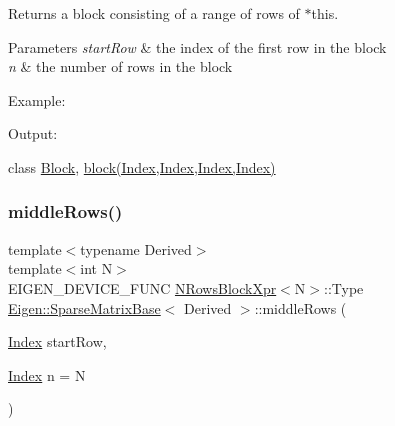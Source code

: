 \begin{DoxyReturn}{Returns}
a block consisting of a range of rows of $\ast$this.
\end{DoxyReturn}

\begin{DoxyParams}{Parameters}
{\em start\+Row} & the index of the first row in the block \\
\hline
{\em n} & the number of rows in the block\\
\hline
\end{DoxyParams}
Example\+: 
\begin{DoxyCodeInclude}{0}
\end{DoxyCodeInclude}
 Output\+: 
\begin{DoxyVerbInclude}
\end{DoxyVerbInclude}
 class \mbox{\hyperlink{class_eigen_1_1_block}{Block}}, \mbox{\hyperlink{class_eigen_1_1_sparse_matrix_base_a7c28a2f511181c727396d5e813519d38}{block(\+Index,\+Index,\+Index,\+Index)}} \mbox{\label{class_eigen_1_1_sparse_matrix_base_a8f5970f79bfb2f270e29a0669c3e8493}} 
\subsubsection{\texorpdfstring{middleRows()}{middleRows()}\hspace{0.1cm}{\footnotesize\ttfamily [2/2]}}
{\footnotesize\ttfamily template$<$typename Derived$>$ \\
template$<$int N$>$ \\
E\+I\+G\+E\+N\+\_\+\+D\+E\+V\+I\+C\+E\+\_\+\+F\+U\+NC \mbox{\hyperlink{struct_eigen_1_1_sparse_matrix_base_1_1_n_rows_block_xpr}{N\+Rows\+Block\+Xpr}}$<$N$>$\+::Type \mbox{\hyperlink{class_eigen_1_1_sparse_matrix_base}{Eigen\+::\+Sparse\+Matrix\+Base}}$<$ Derived $>$\+::middle\+Rows (\begin{DoxyParamCaption}\item[{\mbox{\hyperlink{struct_eigen_1_1_eigen_base_a554f30542cc2316add4b1ea0a492ff02}{Index}}}]{start\+Row,  }\item[{\mbox{\hyperlink{struct_eigen_1_1_eigen_base_a554f30542cc2316add4b1ea0a492ff02}{Index}}}]{n = {\ttfamily N} }\end{DoxyParamCaption})\hspace{0.3cm}{\ttfamily [inline]}}


